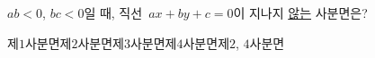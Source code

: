 $ab<0$, $bc<0$일 때, 직선~$ax+by+c=0$이 지나지 \underline{않는} 사분면은?
\begin{choices32}{제$1$사분면}{제$2$사분면}{제$3$사분면}{제$4$사분면}{제$2$, $4$사분면}\end{choices32}

